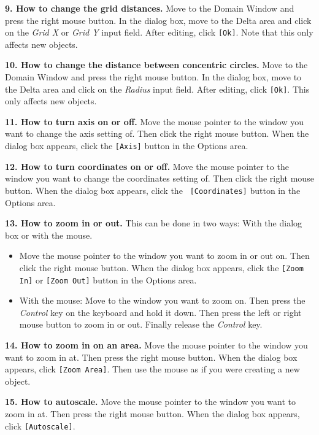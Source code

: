 \documentclass[10pt,a4paper]{article}
\begin{document}
{\bf 9. How to change the grid distances.} Move to the Domain Window
and press the right mouse button. In the dialog box, move to the Delta
area and click on the {\it Grid X} or {\it Grid Y} input field. After
editing, click {\tt [Ok]}. Note that this only affects new objects.



{\bf 10. How to change the distance between concentric circles.} Move
to the Domain Window and press the right mouse button. In the dialog
box, move to the Delta area and click on the {\it Radius} input field.
After editing, click {\tt [Ok]}. This only affects new objects.



{\bf 11. How to turn axis on or off.} Move the mouse pointer to the
window you want to change the axis setting of.  Then click the right
mouse button. When the dialog box appears, click the {\tt [Axis]}
button in the Options area.



{\bf 12. How to turn coordinates on or off.} Move the mouse pointer to
the window you want to change the coordinates setting of. Then click
the right mouse button. When the dialog box appears, click the {\tt
[Coordinates]} button in the Options area.



{\bf 13. How to zoom in or out.} This can be done in two ways: With
the dialog box or with the mouse.
\begin{itemize}
\item Move the mouse pointer to the window you want to zoom in or out
on.  Then click the right mouse button. When the dialog box appears,
click the {\tt [Zoom In]} or {\tt [Zoom Out]} button in the Options
area.
\item With the mouse: Move to the window you want to zoom on. Then
press the {\it Control} key on the keyboard and hold it down. Then
press the left or right mouse button to zoom in or out. Finally
release the {\it Control} key.
\end{itemize}



{\bf 14. How to zoom in on an area.} Move the mouse pointer to the
window you want to zoom in at. Then press the right mouse button. When
the dialog box appears, click {\tt [Zoom Area]}. Then use the mouse as
if you were creating a new object.



{\bf 15. How to autoscale.} Move the mouse pointer to the window you
want to zoom in at. Then press the right mouse button. When the dialog
box appears, click {\tt [Autoscale]}.
\end{document}

